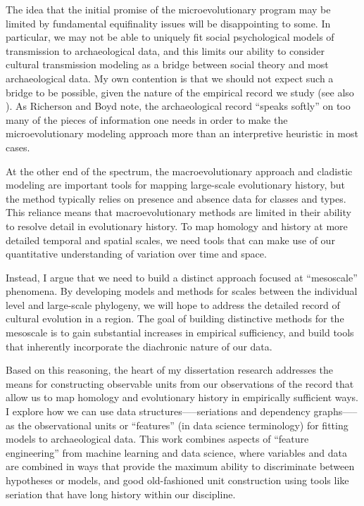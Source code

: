 The idea that the initial promise of the microevolutionary program may be limited by fundamental equifinality issues will be disappointing to some.  In particular, we may not be able to uniquely fit social psychological models of transmission to archaeological data, and this limits our ability to consider cultural transmission modeling as a bridge between social theory and most archaeological data.  My own contention is that we should not expect such a bridge to be possible, given the nature of the empirical record we study (see also \citealt{perreault2019quality}).  As Richerson and Boyd \citeyearpar{richerson2008response} note, the archaeological record ``speaks softly'' on too many of the pieces of information one needs in order to make the microevolutionary modeling approach more than an interpretive heuristic in most cases. 

At the other end of the spectrum, the macroevolutionary approach and cladistic modeling are important tools for mapping large-scale evolutionary history, but the method typically relies on presence and absence data for classes and types. This reliance means that macroevolutionary methods are limited in their ability to resolve detail in evolutionary history. To map homology and history at more detailed temporal and spatial scales, we need tools that can make use of our quantitative understanding of variation over time and space.

Instead, I argue that we need to build a distinct approach focused at ``mesoscale'' phenomena.   By developing models and methods for scales between the individual level and large-scale phylogeny, we will hope to address the detailed record of cultural evolution in a region.  The goal of building distinctive methods for the mesoscale is to gain substantial increases in empirical sufficiency, and build tools that inherently incorporate the diachronic nature of our data.

Based on this reasoning, the heart of my dissertation research addresses the means for constructing observable units from our observations of the record that allow us to map homology and evolutionary history in empirically sufficient ways. I explore how we can use data structures—--seriations and dependency graphs—--as the observational units or ``features'' (in data science terminology) for fitting models to archaeological data. This work combines aspects of ``feature engineering'' from machine learning and data science, where variables and data are combined in ways that provide the maximum ability to discriminate between hypotheses or models, and good old-fashioned unit construction using tools like seriation that have long history within our discipline.

